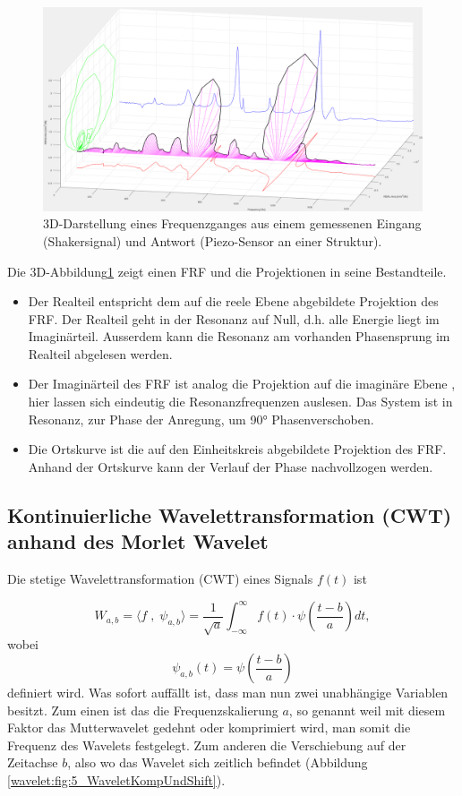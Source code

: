 \begin{figure}
	\centering
	\includegraphics[width=\textwidth]{papers/wavelets/images/4_FRF_iso.png}
	\caption{3D-Darstellung eines Frequenzganges aus einem gemessenen Eingang (Shakersignal) und Antwort (Piezo-Sensor an einer Struktur).}
	\label{wavelet:fig:FRF_iso}
\end{figure}

Die 3D-Abbildung\ref{wavelet:fig:FRF_iso} zeigt einen FRF und die Projektionen in seine Bestandteile.

\begin{itemize}
	\item Der Realteil entspricht dem auf die reele Ebene abgebildete Projektion des FRF. Der Realteil geht in der Resonanz auf Null, d.h. alle Energie liegt im Imaginärteil. Ausserdem kann die Resonanz am vorhanden Phasensprung im Realteil abgelesen werden.
	\item Der Imaginärteil des FRF ist analog die Projektion auf die imaginäre Ebene , hier lassen sich eindeutig die Resonanzfrequenzen auslesen. Das System ist in Resonanz, zur Phase der Anregung, um 90° Phasenverschoben.
	\item Die Ortskurve ist die auf den Einheitskreis abgebildete Projektion des FRF. Anhand der Ortskurve kann der Verlauf der Phase nachvollzogen werden.
\end{itemize}

\subsection{Kontinuierliche Wavelettransformation (CWT) anhand des Morlet Wavelet
	\label{wavelets:subsection:CWT}}
Die stetige Wavelettransformation (CWT) eines Signals $f(t)$ ist

\begin{equation}
	W_{a,b}=\langle f \; , \; \psi_{a,b} \rangle = \frac{1}{\sqrt{a}}\int_{-\infty}^{\infty} f(t)\cdot\psi\left(\frac{t-b}{a}\right) dt,
	\label{wavelets:equation3}
\end{equation}
wobei
\[\psi_{a,b}(t)=\psi\left(\frac{t-b}{a}\right)\]
definiert wird. Was sofort auffällt ist, dass man nun zwei unabhängige Variablen besitzt. Zum einen ist das die Frequenzskalierung $a$, so genannt weil mit diesem Faktor das Mutterwavelet gedehnt oder komprimiert wird, man somit die Frequenz des Wavelets festgelegt. Zum anderen die Verschiebung auf der Zeitachse $b$, also wo das Wavelet sich zeitlich befindet (Abbildung \ref{wavelet:fig:5_WaveletKompUndShift}).

